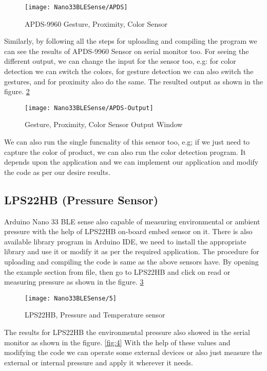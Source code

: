 \begin{figure}[htbp]
	\centering
	\texttt{[image: Nano33BLESense/APDS]}
	\caption{APDS-9960 Gesture, Proximity, Color Sensor}
	\label{fig:1}
\end{figure}

Similarly, by following all the steps for uploading and compiling the program we can see the results of APDS-9960 Sensor on serial monitor too. For seeing the different output, we can change the input for the sensor too, e.g: for color detection we can switch the colors, for gesture detection we can also switch the gestures, and for proximity also do the same. The resulted output as shown in the figure.  \ref{fig:2} 

\begin{figure}[htbp]
	\centering
	\texttt{[image: Nano33BLESense/APDS-Output]}
	\caption{Gesture, Proximity, Color Sensor Output Window}
	\label{fig:2}
\end{figure}

We can also run the single funcnality of this sensor too, e.g; if we just need to capture the color of product, we can also run the color detection program. It depends upon the application and we can implement our application and modify the code as per our desire results.

\subsection{LPS22HB (Pressure Sensor)}
Arduino Nano 33 BLE sense also capable of measuring environmental or ambient pressure with the help of LPS22HB on-board embed sensor on it. There is also available library program in Arduino IDE, we need to install the appropriate library and use it or  modify it as per the required application. The procedure for uploading and compiling the code is same as the above sensors have. By opening the example section from file, then go to LPS22HB and click on read or measuring pressure as shown in the figure.  \ref{fig:3} 

\begin{figure}[htbp]
	\centering
	\texttt{[image: Nano33BLESense/5]}
	\caption{LPS22HB, Pressure and Temperature sensor}
	\label{fig:3}
\end{figure}

The results for LPS22HB the environmental pressure also showed in the serial monitor as shown in the figure.  \ref{fig:4} With the help of these values and modifying the code we can operate some external devices or also just measure the external or internal pressure and apply it wherever it needs.

